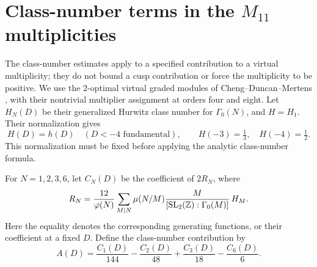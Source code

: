 \section{Class-number terms in the \(M_{11}\) multiplicities}
The class-number estimates apply to a specified contribution to a virtual
multiplicity; they do not bound a cusp contribution or force the
multiplicity to be positive.
We use the \(2\)-optimal virtual graded modules of
Cheng--Duncan--Mertens \cite[Theorem~4.2.5 and Sect.~4.3]{CDM2025},
with their nontrivial multiplier assignment at orders four and eight.
Let \(H_N(D)\) be their generalized Hurwitz class number for
\(\Gamma_0(N)\), and \(H=H_1\). Their normalization gives
\[
 H(D)=h(D)\quad(D<-4\text{ fundamental}),\qquad
 H(-3)=\tfrac13,\quad H(-4)=\tfrac12.
\]
This normalization must be fixed before applying the analytic
class-number formula.

For \(N=1,2,3,6\), let \(C_N(D)\) be the coefficient of \(2R_N\),
where
\[
 R_N=\frac{12}{\varphi(N)}
       \sum_{M\mid N}\mu(N/M)
       \frac{M}{[\mathrm{SL}_2(\mathbb Z):\Gamma_0(M)]}\,H_M.
\]
Here the equality denotes the corresponding generating functions,
or their coefficient at a fixed \(D\).
Define the class-number contribution by
\[
 A(D)=\frac{C_1(D)}{144}-\frac{C_2(D)}{48}
              +\frac{C_3(D)}{18}-\frac{C_6(D)}6.
\]

